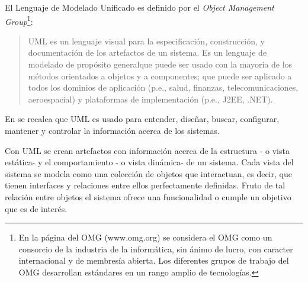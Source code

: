 El Lenguaje de Modelado Unificado es definido por el \textit{Object Management Group}\footnote{En la página del OMG (www.omg.org) se considera el OMG como un consorcio de la industria de la informática, sin ánimo de lucro, con caracter internacional y de membresía abierta. Los diferentes grupos de trabajo del OMG desarrollan estándares en un rango amplio de tecnologías.}:
\begin{quote}
UML es un lenguaje visual para la especificación, construcción, y documentación de los artefactos de un sistema. Es un lenguaje de modelado de propósito generalque puede ser usado con la mayoría de los métodos orientados a objetos y a componentes; que puede ser aplicado a todos los dominios de aplicación (p.e., salud, finanzas, telecomunicaciones, aeroespacial) y plataformas de implementación (p.e., J2EE, .NET). \end{quote} 

En \cite{jacobson2005} se recalca que UML es usado para entender, diseñar, buscar, configurar, mantener y controlar la información acerca de los sistemas.

Con UML se crean artefactos con información acerca de la estructura - o vista estática- y el comportamiento - o vista dinámica- de un sistema. Cada vista del sistema se modela como una colección de objetos que interactuan, es decir, que tienen interfaces y relaciones entre ellos perfectamente definidas. Fruto de tal relación entre objetos el sistema ofrece una funcionalidad o cumple un objetivo que es de interés.